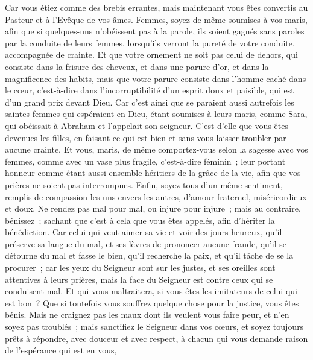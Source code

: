 \begin{multicols}{2}
Car vous étiez comme des brebis errantes, mais maintenant vous êtes convertis au Pasteur et à l'Evêque de vos âmes. 
\VerseOne{}Femmes, soyez de même soumises à vos maris, afin que si quelques-uns n'obéissent pas à la parole, ils soient gagnés sans paroles par la conduite de leurs femmes,
lorsqu'ils verront la pureté de votre conduite, accompagnée de crainte.
Et que votre ornement ne soit pas celui de dehors, qui consiste dans la frisure des cheveux, et dans une parure d'or, et dans la magnificence des habits,
mais que votre parure consiste dans l'homme caché dans le cœur, c'est-à-dire dans l'incorruptibilité d'un esprit doux et paisible, qui est d'un grand prix devant Dieu.
Car c'est ainsi que se paraient aussi autrefois les saintes femmes qui espéraient en Dieu, étant soumises à leurs maris,
comme Sara, qui obéissait à Abraham et l'appelait son seigneur. C'est d'elle que vous êtes devenues les filles, en faisant ce qui est bien et sans vous laisser troubler par aucune crainte.
Et vous, maris, de même comportez-vous selon la sagesse avec vos femmes, comme avec un vase plus fragile, c'est-à-dire féminin~; leur portant honneur comme étant aussi ensemble héritiers de la grâce de la vie, afin que vos prières ne soient pas interrompues. 
Enfin, soyez tous d'un même sentiment, remplis de compassion les uns envers les autres, d'amour fraternel, miséricordieux et doux.
Ne rendez pas mal pour mal, ou injure pour injure~; mais au contraire, bénissez~; sachant que c'est à cela que vous êtes appelés, afin d'hériter la bénédiction.
Car celui qui veut aimer sa vie et voir des jours heureux, qu'il préserve sa langue du mal, et ses lèvres de prononcer aucune fraude,
qu'il se détourne du mal et fasse le bien, qu'il recherche la paix, et qu'il tâche de se la procurer~;
car les yeux du Seigneur sont sur les justes, et ses oreilles sont attentives à leurs prières, mais la face du Seigneur est contre ceux qui se conduisent mal.
Et qui vous maltraitera, si vous êtes les imitateurs de celui qui est bon~?
Que si toutefois vous souffrez quelque chose pour la justice, vous êtes bénis. Mais ne craignez pas les maux dont ils veulent vous faire peur, et n'en soyez pas troublés~;
mais sanctifiez le Seigneur dans vos cœurs, et soyez toujours prêts à répondre, avec douceur et avec respect, à chacun qui vous demande raison de l'espérance qui est en vous, 

\end{multicols}
